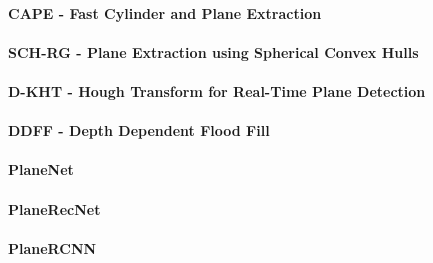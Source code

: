 \documentclass[main.tex]{subfiles}
\begin{document}
\paragraph{CAPE - Fast Cylinder and Plane Extraction}
\paragraph{SCH-RG - Plane Extraction using Spherical Convex Hulls}
\paragraph{D-KHT - Hough Transform for Real-Time Plane Detection}
\paragraph{DDFF - Depth Dependent Flood Fill}
\paragraph{PlaneNet}
\paragraph{PlaneRecNet}
\paragraph{PlaneRCNN}
\end{document}
